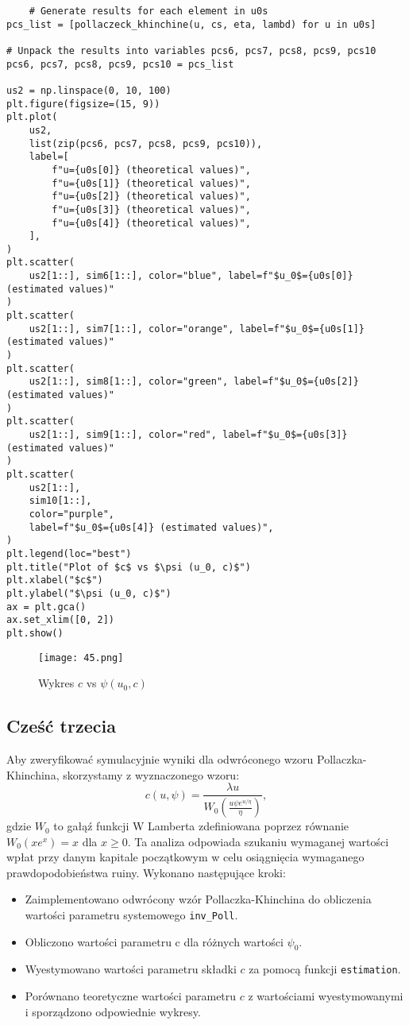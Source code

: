 \documentclass[12pt,letterpaper]{article}
\theoremstyle{definition}
\begin{document}
\begin{lstlisting}
    # Generate results for each element in u0s
pcs_list = [pollaczeck_khinchine(u, cs, eta, lambd) for u in u0s]

# Unpack the results into variables pcs6, pcs7, pcs8, pcs9, pcs10
pcs6, pcs7, pcs8, pcs9, pcs10 = pcs_list

us2 = np.linspace(0, 10, 100)
plt.figure(figsize=(15, 9))
plt.plot(
    us2,
    list(zip(pcs6, pcs7, pcs8, pcs9, pcs10)),
    label=[
        f"u={u0s[0]} (theoretical values)",
        f"u={u0s[1]} (theoretical values)",
        f"u={u0s[2]} (theoretical values)",
        f"u={u0s[3]} (theoretical values)",
        f"u={u0s[4]} (theoretical values)",
    ],
)
plt.scatter(
    us2[1::], sim6[1::], color="blue", label=f"$u_0$={u0s[0]} (estimated values)"
)
plt.scatter(
    us2[1::], sim7[1::], color="orange", label=f"$u_0$={u0s[1]} (estimated values)"
)
plt.scatter(
    us2[1::], sim8[1::], color="green", label=f"$u_0$={u0s[2]} (estimated values)"
)
plt.scatter(
    us2[1::], sim9[1::], color="red", label=f"$u_0$={u0s[3]} (estimated values)"
)
plt.scatter(
    us2[1::],
    sim10[1::],
    color="purple",
    label=f"$u_0$={u0s[4]} (estimated values)",
)
plt.legend(loc="best")
plt.title("Plot of $c$ vs $\psi (u_0, c)$")
plt.xlabel("$c$")
plt.ylabel("$\psi (u_0, c)$")
ax = plt.gca()
ax.set_xlim([0, 2])
plt.show()

\end{lstlisting}
\begin{figure}[h!]
    \centering
    \texttt{[image: 45.png]} 


    \caption{Wykres $c$ vs $\psi (u_0, c)$}

\end{figure}
\subsection{Cześć trzecia}
Aby zweryfikować symulacyjnie wyniki dla odwróconego wzoru Pollaczka-Khinchina, skorzystamy z wyznaczonego wzoru:
\[
c(u, \psi) = \frac{\lambda u}{W_0 \left( \frac{u \psi e^{u / \eta}}{\eta} \right)},
\]
gdzie \( W_0 \) to gałąź funkcji W Lamberta zdefiniowana poprzez równanie \( W_0(x e^x) = x \) dla \( x \geq 0 \). Ta analiza odpowiada szukaniu wymaganej wartości wpłat przy danym kapitale początkowym w celu osiągnięcia wymaganego prawdopodobieństwa ruiny. Wykonano następujące kroki:
\begin{itemize}
    \item Zaimplementowano odwrócony wzór Pollaczka-Khinchina do obliczenia wartości parametru systemowego \texttt{inv\_Poll}.
    \item Obliczono wartości parametru c dla różnych wartości $\psi_0$.
    \item Wyestymowano wartości parametru składki \( c \) za pomocą funkcji \texttt{estimation}.
    \item Porównano teoretyczne wartości parametru \( c \) z wartościami wyestymowanymi i sporządzono odpowiednie wykresy.
\end{itemize}
\end{document}
